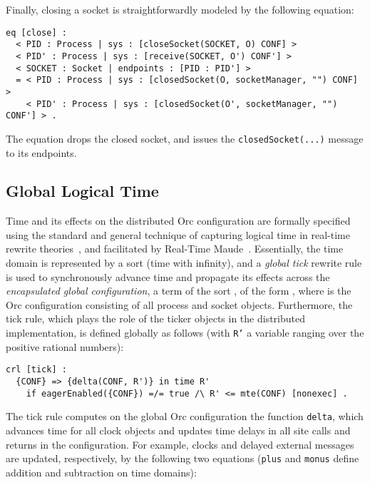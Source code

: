 \documentclass{eptcs}
\begin{document}
Finally, closing a socket is straightforwardly modeled by the following equation:

\begin{small}
\begin{verbatim}
eq [close] : 
  < PID : Process | sys : [closeSocket(SOCKET, O) CONF] >
  < PID' : Process | sys : [receive(SOCKET, O') CONF'] >
  < SOCKET : Socket | endpoints : [PID : PID'] > 
  = < PID : Process | sys : [closedSocket(O, socketManager, "") CONF] >
    < PID' : Process | sys : [closedSocket(O', socketManager, "") CONF'] > .
\end{verbatim}
\end{small}

\noindent The equation drops the closed socket, and issues the \texttt{closedSocket(...)} message to its endpoints.
  

\subsection{Global Logical Time} \label{sec:global-logical-time}

Time and its effects on the distributed Orc configuration are formally specified using the standard and general technique of capturing logical time in real-time rewrite theories~\cite{RTTheories05}, and facilitated by Real-Time Maude~\cite{RTMManual07}. Essentially, the time domain is represented by a sort  (time with infinity), and a \emph{global tick} rewrite rule is used to synchronously advance time and propagate its effects across the \emph{encapsulated global configuration}, a term of the sort , of the form , where  is the Orc configuration consisting of all process and socket objects. Furthermore, the tick rule, which plays the role of the ticker objects in the distributed implementation, is defined globally as follows (with \texttt{R'} a variable ranging over the positive rational numbers): 

\begin{small}
\begin{verbatim}
crl [tick] : 
  {CONF} => {delta(CONF, R')} in time R'
    if eagerEnabled({CONF}) =/= true /\ R' <= mte(CONF) [nonexec] .
\end{verbatim}
\end{small}

\noindent The tick rule computes on the global Orc configuration the function \texttt{delta}, which advances time for all clock objects and updates time delays in all site calls and returns in the configuration. For example, clocks and delayed external messages are updated, respectively, by the following two equations (\texttt{plus} and \texttt{monus} define addition and subtraction on time domains):
\end{document}
